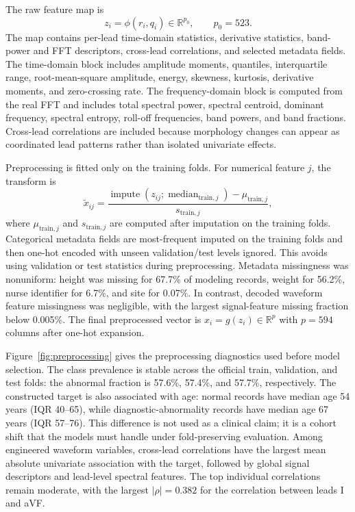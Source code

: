 \documentclass{article}
\newcommand{\R}{\mathbb{R}}
\begin{document}
The raw feature map is
\begin{equation}
  z_i=\phi(r_i,q_i)\in\R^{p_0},\qquad p_0=523.
\end{equation}
The map contains per-lead time-domain statistics, derivative statistics, band-power and FFT descriptors, cross-lead correlations, and selected metadata fields. The time-domain block includes amplitude moments, quantiles, interquartile range, root-mean-square amplitude, energy, skewness, kurtosis, derivative moments, and zero-crossing rate. The frequency-domain block is computed from the real FFT and includes total spectral power, spectral centroid, dominant frequency, spectral entropy, roll-off frequencies, band powers, and band fractions. Cross-lead correlations are included because morphology changes can appear as coordinated lead patterns rather than isolated univariate effects.

Preprocessing is fitted only on the training folds. For numerical feature \(j\), the transform is
\begin{equation}
  \tilde{x}_{ij}
  =
  \frac{\operatorname{impute}(z_{ij};\operatorname{median}_{\mathrm{train},j})-\mu_{\mathrm{train},j}}
  {s_{\mathrm{train},j}},
  \label{eq:preprocess}
\end{equation}
where \(\mu_{\mathrm{train},j}\) and \(s_{\mathrm{train},j}\) are computed after imputation on the training folds. Categorical metadata fields are most-frequent imputed on the training folds and then one-hot encoded with unseen validation/test levels ignored. This avoids using validation or test statistics during preprocessing. Metadata missingness was nonuniform: height was missing for 67.7\% of modeling records, weight for 56.2\%, nurse identifier for 6.7\%, and site for 0.07\%. In contrast, decoded waveform feature missingness was negligible, with the largest signal-feature missing fraction below 0.005\%. The final preprocessed vector is \(x_i=g(z_i)\in\R^p\) with \(p=594\) columns after one-hot expansion.

Figure~\ref{fig:preprocessing} gives the preprocessing diagnostics used before model selection. The class prevalence is stable across the official train, validation, and test folds: the abnormal fraction is 57.6\%, 57.4\%, and 57.7\%, respectively. The constructed target is also associated with age: normal records have median age 54 years (IQR 40--65), while diagnostic-abnormality records have median age 67 years (IQR 57--76). This difference is not used as a clinical claim; it is a cohort shift that the models must handle under fold-preserving evaluation. Among engineered waveform variables, cross-lead correlations have the largest mean absolute univariate association with the target, followed by global signal descriptors and lead-level spectral features. The top individual correlations remain moderate, with the largest \(|\rho|=0.382\) for the correlation between leads I and aVF.
\end{document}
